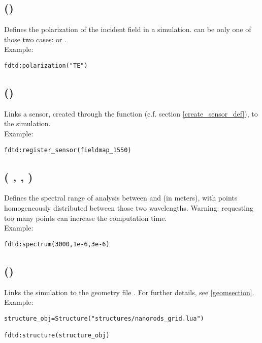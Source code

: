 \subsection[polarization]{()}

Defines the polarization of the incident field in a simulation.  can be only one of those two cases:  or .\\ Example:
\begin{lstlisting}
fdtd:polarization("TE")
\end{lstlisting}

\subsection[register\_sensor]{()}

Links a sensor, created through the  function (c.f. section \ref{create_sensor_def}), to the simulation. \\ Example:
\begin{lstlisting}
fdtd:register_sensor(fieldmap_1550)
\end{lstlisting}

\subsection[spectrum]{( ,  , )}

Defines the spectral range of analysis between  and  (in meters), with  points homogeneously distributed between those two wavelengths. Warning: requesting too many points can increase the computation time.\\ Example:
\begin{lstlisting}
fdtd:spectrum(3000,1e-6,3e-6)
\end{lstlisting}

\subsection[structure]{()}

Links the simulation to the geometry file . For further details, see \ref{geomsection}.\\ Example:
\begin{lstlisting}
structure_obj=Structure("structures/nanorods_grid.lua")

fdtd:structure(structure_obj)
\end{lstlisting}

